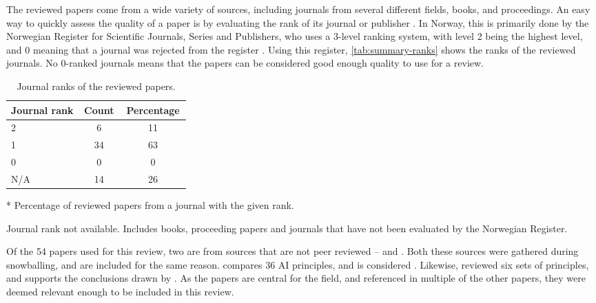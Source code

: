 The reviewed papers come from a wide variety of sources, including journals from several different fields, books, and proceedings. An easy way to quickly assess the quality of a paper is by evaluating the rank of its journal or publisher \parencite{Keathley-Herring_2016}. In Norway, this is primarily done by the Norwegian Register for Scientific Journals, Series and Publishers, who uses a 3-level ranking system, with level 2 being the highest level, and 0 meaning that a journal was rejected from the register \parencite{kanalregisteret}. Using this register, \autoref{tab:summary-ranks} shows the ranks of the reviewed journals. No 0-ranked journals means that the papers can be considered good enough quality to use for a review.

\begin{table}[htpb]
    \centering
    \caption{Journal ranks of the reviewed papers.}
    \label{tab:summary-ranks}
    \begin{threeparttable}
    \begin{tabular}{p{0.4\linewidth}cc}
    \toprule
        \textbf{Journal rank} & \textbf{Count} & \textbf{Percentage}\tnote{*} \\
    \midrule
        2                       & 6     & 11    \\
        1                       & 34    & 63    \\
        0                       & 0     & 0     \\
        N/A\tnote{\textdagger}  & 14    & 26    \\
    \bottomrule
    \end{tabular}
    \begin{tablenotes}
        \footnotesize
        \item [*] Percentage of reviewed papers from a journal with the given rank.
        \item [\textdagger] Journal rank not available. Includes books, proceeding papers and journals that have not been evaluated by the Norwegian Register.
    \end{tablenotes}
\end{threeparttable}
\end{table}

Of the 54 papers used for this review, two are from sources that are not peer reviewed -- \textcite{Fjeld_2020} and \textcite{Floridi_2019}. Both these sources were gathered during snowballing, and are included for the same reason. \textcite{Fjeld_2020} compares 36 AI principles, and is considered  \parencite[p.~2]{Bélisle-Pipon_2022}. Likewise, \textcite{Floridi_2019} reviewed six sets of principles, and supports the conclusions drawn by \textcite{Floridi_2018}. As the papers are central for the field, and referenced in multiple of the other papers, they were deemed relevant enough to be included in this review.

